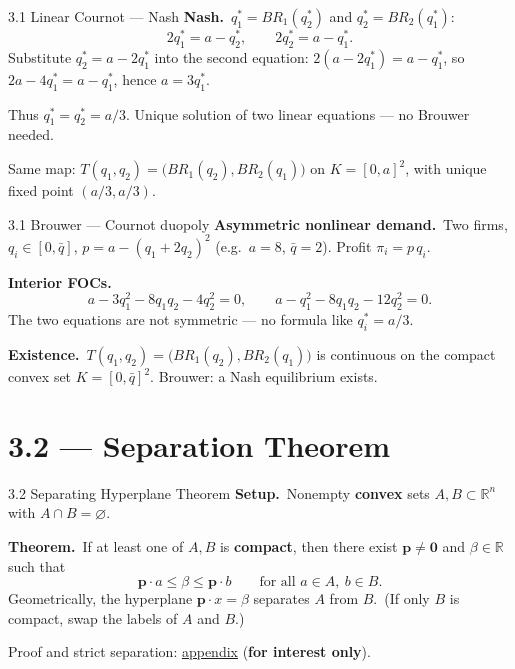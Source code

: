 \documentclass[11pt,aspectratio=169]{beamer}
\newcommand{\InterestOnly}{\textcolor{mAccent}{\textbf{for interest only}}}
\newcommand{\AppendixLink}[1]{%
  \hyperlink{#1}{\textcolor{mAccent}{appendix}}}
\begin{document}
\begin{frame}{3.1 Linear Cournot --- Nash}
  \footnotesize
  \textbf{Nash.}\ $q_1^*=BR_1(q_2^*)$ and $q_2^*=BR_2(q_1^*)$:
  \[
    2q_1^*=a-q_2^*,\qquad 2q_2^*=a-q_1^*.
  \]
  Substitute $q_2^*=a-2q_1^*$ into the second equation:
  \(2(a-2q_1^*)=a-q_1^*\), so \(2a-4q_1^*=a-q_1^*\), hence \(a=3q_1^*\).

  \medskip
  Thus $q_1^*=q_2^*=a/3$. Unique solution of two linear equations --- no Brouwer needed.

  \medskip
  Same map: $T(q_1,q_2)=\bigl(BR_1(q_2),BR_2(q_1)\bigr)$ on $K=[0,a]^2$,
  with unique fixed point $(a/3,a/3)$.
\end{frame}

\begin{frame}{3.1 Brouwer --- Cournot duopoly}
  \footnotesize
  \textbf{Asymmetric nonlinear demand.}\ Two firms, $q_i\in[0,\bar q]$,
  \(p=a-(q_1+2q_2)^2\) (e.g.\ $a=8$, $\bar q=2$).
  Profit $\pi_i=p\,q_i$.

  \medskip
  \textbf{Interior FOCs.}\
  \[
    a-3q_1^2-8q_1 q_2-4q_2^2=0,
    \qquad
    a-q_1^2-8q_1 q_2-12q_2^2=0.
  \]
  The two equations are not symmetric --- no formula like $q_i^*=a/3$.

  \medskip
  \textbf{Existence.}\ $T(q_1,q_2)=\bigl(BR_1(q_2),BR_2(q_1)\bigr)$ is continuous on
  the compact convex set $K=[0,\bar q]^2$. Brouwer: a Nash equilibrium exists.
\end{frame}

\section{3.2 --- Separation Theorem}

\begin{frame}{3.2 Separating Hyperplane Theorem}
  \footnotesize
  \textbf{Setup.}\
  Nonempty \textbf{convex} sets $A,B\subset\mathbb{R}^n$ with $A\cap B=\varnothing$.

  \medskip
  \textbf{Theorem.}\
  If at least one of $A,B$ is \textbf{compact}, then there exist $\mathbf{p}\neq\mathbf{0}$ and $\beta\in\mathbb{R}$ such that
  \[
    \mathbf{p}\cdot a \le \beta \le \mathbf{p}\cdot b
    \qquad\text{for all } a\in A,\ b\in B.
  \]
  Geometrically, the hyperplane $\mathbf{p}\cdot x=\beta$ separates $A$ from $B$.\
  (If only $B$ is compact, swap the labels of $A$ and $B$.)

  \medskip
  {\scriptsize Proof and strict separation: \AppendixLink{sec:separation-proof} (\InterestOnly).}
\end{frame}
\end{document}
